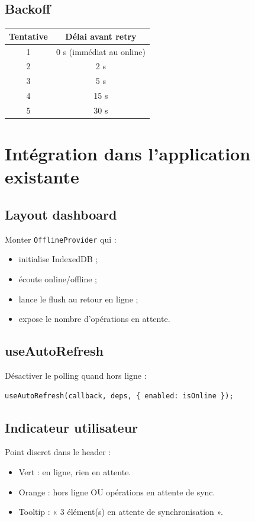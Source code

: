 \documentclass[12pt,a4paper]{report}
\begin{document}
\subsection{Backoff}

\begin{longtable}{@{}cc@{}}
\hline
\textbf{Tentative} & \textbf{Délai avant retry} \\
\hline
1 & 0 s (immédiat au online) \\
2 & 2 s \\
3 & 5 s \\
4 & 15 s \\
5 & 30 s \\
\hline
\end{longtable}

\section{Intégration dans l'application existante}

\subsection{Layout dashboard}

Monter \texttt{OfflineProvider} qui :
\begin{itemize}
  \item initialise IndexedDB ;
  \item écoute online/offline ;
  \item lance le flush au retour en ligne ;
  \item expose le nombre d'opérations en attente.
\end{itemize}

\subsection{useAutoRefresh}

Désactiver le polling quand hors ligne :

\begin{verbatim}
useAutoRefresh(callback, deps, { enabled: isOnline });
\end{verbatim}

\subsection{Indicateur utilisateur}

Point discret dans le header :
\begin{itemize}
  \item Vert : en ligne, rien en attente.
  \item Orange : hors ligne OU opérations en attente de sync.
  \item Tooltip : « 3 élément(s) en attente de synchronisation ».
\end{itemize}
\end{document}
